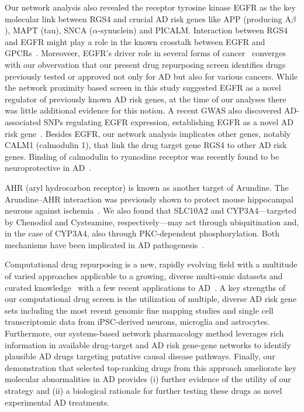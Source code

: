 \documentclass[letterpaper]{article}
\begin{document}
Our network analysis also revealed the receptor tyrosine kinase EGFR as the key
molecular link between RGS4 and crucial AD risk genes like APP (producing
A$\beta$), MAPT (tau), SNCA ($\alpha$-synuclein) and PICALM.  Interaction
between RGS4 and EGFR might play a role in the known crosstalk between EGFR
and GPCRs~\cite{Wang2016c}.  Moreoveer, EGFR's driver role in several forms of
cancer~\cite{Sigismund2018} converges with our obvervation that our present
drug repurposing screen identifies drugs previously tested or
approved not only for AD but also for various cancers.  While
the network proximity based screen in this study suggested EGFR as a novel
regulator of previously known AD risk genes, at the time of our analyses there was
little additional evidence for this notion.  A recent GWAS also
discovered AD-associated SNPs regulating EGFR expression, establishing EGFR as
a novel AD risk gene~\cite{Bellenguez2022}.  Besides EGFR, our network analysis implicates
other genes, notably CALM1 (calmodulin 1), that link the drug target gene RGS4 to
other AD risk genes.  Binding of calmodulin to ryanodine receptor was recently found
to be neuroprotective in AD~\cite{Nakamura2021}.

AHR (aryl hydrocarbon receptor) is known as another target of Arundine.  The
Arundine--AHR interaction was previously shown to protect mouse hippocampal
neurons against ischemia~\cite{Rzemieniec2019}.  We also found that SLC10A2
and CYP3A4---targeted by Chenodiol and Cysteamine, respectively---may act
through ubiquitination and, in the case of CYP3A4, also through PKC-dependent
phosphorylation.  Both mechanisms have been implicated in AD
pathogenesis~\cite{Hegde2019,Alfonso2016}.

Computational drug repurposing is a new, rapidly evolving field with a
multitude of varied approaches applicable to a growing, diverse multi-omic
datasets and curated knowledge~\citep{Pushpakom2019} with a few recent
applications to AD~\citep{Taubes2021,Fang2021}. A key strengths of our
computational drug screen is the utilization of multiple, diverse AD risk gene sets
including the most recent genomic fine mapping studies and single cell
transcriptomic data from iPSC-derived neurons, microglia and astrocytes.
Furthermore, our systems-based network pharmacology method leverages rich
information in available drug-target and AD risk gene-gene networks to identify
plausible AD drugs targeting putative causal disease pathways. Finally, our
demonstration that selected top-ranking drugs from this approach ameliorate
key molecular abnormalities in AD provides (i) further evidence of the utility
of our strategy and (ii) a biological rationale for further testing these
drugs as novel experimental AD treatments.
\end{document}

